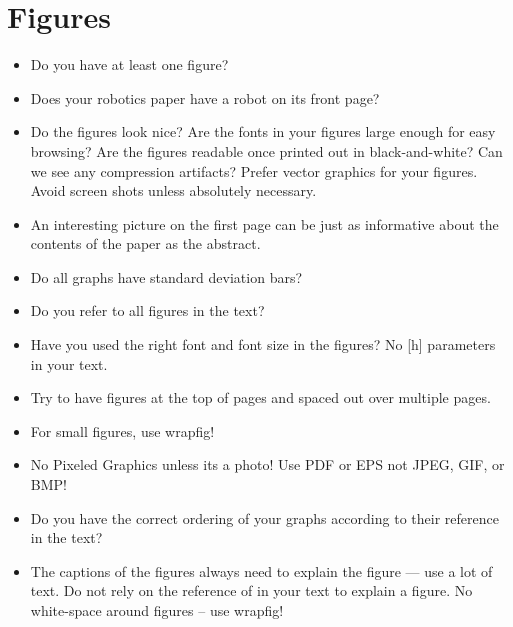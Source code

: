 \section{Figures}
\begin{itemize}

\item Do you have at least one figure?
\item Does your robotics paper have a robot on its front page?
\item Do the figures look nice? Are the fonts in your figures large enough for easy browsing? Are the figures readable once printed out in black-and-white? Can we see any compression artifacts? Prefer vector graphics for your figures. Avoid screen shots unless absolutely necessary.
\item An interesting picture on the first page can be just as informative about the contents of the paper as the abstract.
\item Do all graphs have standard deviation bars?
\item Do you refer to all figures in the text?
\item Have you used the right font and font size in the figures? No [h] parameters in your text.
\item Try to have figures at the top of pages and spaced out over multiple pages.
\item For small figures, use wrapfig!
\item No Pixeled Graphics unless its a photo! Use PDF or EPS not JPEG, GIF, or BMP!
\item Do you have the correct ordering of your graphs according to their reference in the text?
\item The captions of the figures always need to explain the figure --- use a lot of text. Do not rely on the reference of in your text to explain a figure. No white-space around figures -- use wrapfig!

\end{itemize}


